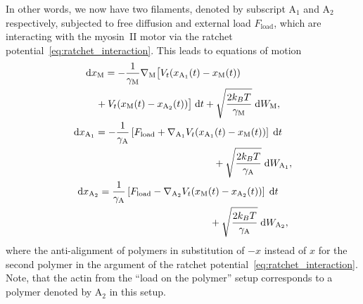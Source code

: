 \documentclass[aps,pre,twocolumn,showpacs,showkeys,superscriptaddress,floatfix]{revtex4-1}
\newcommand{\rmd}{{\mathrm d}}
\begin{document}
In other words, we now have two filaments, denoted by subscript ${\text{A}_1}$ and ${\text{A}_2}$ respectively,
subjected to free diffusion and external load $F_\text{load}$,
which are interacting with the myosin~II motor via the ratchet potential~\eqref{eq:ratchet_interaction}.
This leads to equations of motion 
\begin{equation}
\begin{gathered}
\begin{multlined}[b][.45\textwidth]
\rmd x_\text{M} = 
- \frac{1}{\gamma_\text{M}} \nabla_\text{M} \bigl[ 
V_t(x_{\text{A}_1}(t) - x_\text{M}(t)) 
\\
+ V_t(x_\text{M}(t) - x_{\text{A}_2}(t)) 
\bigr] \; \rmd t 
+ \sqrt{ \frac{2 k_B T}{\gamma_\text{M}} } \; \rmd W_\text{M} ,
\end{multlined}\\
\begin{multlined}[b][.45\textwidth]
\rmd x_{\text{A}_1} = 
- \frac{1}{\gamma_\text{A}} \left[ F_\text{load} + \nabla_{\text{A}_1} V_t(x_{\text{A}_1}(t) - x_\text{M}(t)) \right] \; \rmd t 
\\
+ \sqrt{ \frac{2 k_B T}{\gamma_\text{A}} } \; \rmd W_{\text{A}_1} ,
\end{multlined}\\
\begin{multlined}[b][.45\textwidth]
\rmd x_{\text{A}_2} = 
\frac{1}{\gamma_\text{A}} \left[ F_\text{load} - \nabla_{\text{A}_2} V_t(x_\text{M}(t) - x_{\text{A}_2}(t)) \right] \; \rmd t 
\\
+ \sqrt{ \frac{2 k_B T}{\gamma_\text{A}} } \; \rmd W_{\text{A}_2} ,
\end{multlined}
\end{gathered}
\label{eq:eom_two_actins}
\end{equation}
where the anti-alignment of polymers in substitution of $-x$ instead of $x$ for the second polymer in the argument of the ratchet potential~\eqref{eq:ratchet_interaction}.
Note, that the actin from the ``load on the polymer'' setup corresponds to a polymer denoted by $\text{A}_2$ in this setup. 
\end{document}
